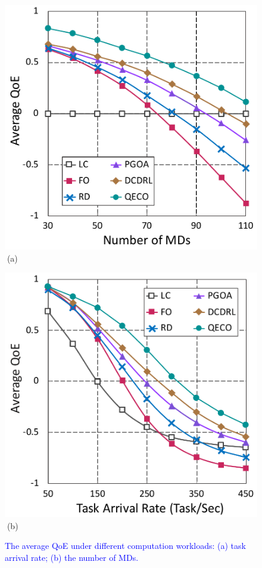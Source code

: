 \documentclass[10pt, journal,letterpaper]{IEEEtran}
\begin{document}
\begin{figure}[tbp]
	\captionsetup{name=Fig.}
	\begin{minipage}[b]{0.50\linewidth}
		\centering
		\includegraphics[width=\textwidth]{ qoe_2} 		
		\textcolor{white}{i}\hspace{0.6cm}(a)
	\end{minipage}
	\hspace{-0.2cm}
	\begin{minipage}[b]{0.50\linewidth}
		\centering
		\includegraphics[width=\textwidth]{ qoe_1}
		\textcolor{white}{i}\hspace{0.6cm}(b)
	\end{minipage}
	\vspace{-0.7cm}
	\caption{\textcolor{blue}{The average QoE under different computation workloads: (a) task arrival rate; (b) the number of MDs.}}
	\label{chart4}
\end{figure} 
\end{document}
